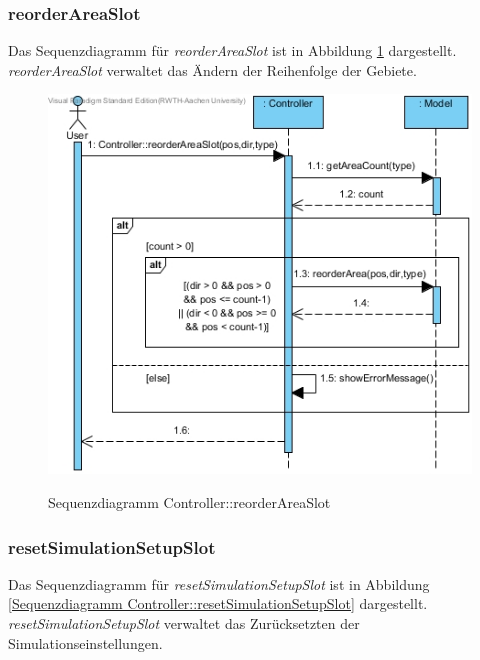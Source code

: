 \subsubsection*{reorderAreaSlot}

Das Sequenzdiagramm für \emph{reorderAreaSlot} ist in Abbildung \ref{Sequenzdiagramm Controller::reorderAreaSlot} dargestellt. \emph{reorderAreaSlot} verwaltet das Ändern der Reihenfolge der Gebiete.

\begin{figure}[H]
	\centering
	\includegraphics[scale=.7]{Bilder/Controller__reorderAreaSlot().jpg}\\
	\caption{Sequenzdiagramm Controller::reorderAreaSlot}
	\label{Sequenzdiagramm Controller::reorderAreaSlot}
\end{figure}
\newpage
\subsubsection*{resetSimulationSetupSlot}

Das Sequenzdiagramm für \emph{resetSimulationSetupSlot} ist in Abbildung \ref{Sequenzdiagramm Controller::resetSimulationSetupSlot} dargestellt. \emph{resetSimulationSetupSlot} verwaltet das Zurücksetzten der Simulationseinstellungen.


